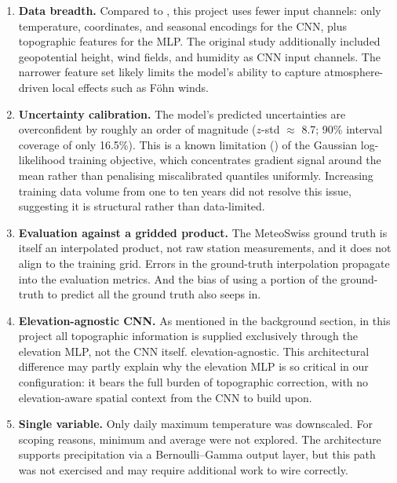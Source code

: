 \begin{enumerate}
    \item \textbf{Data breadth.} Compared to \citet{vaughan2022}, this project uses fewer input channels: only temperature, coordinates, and seasonal encodings for the CNN, plus topographic features for the MLP. The original study additionally included geopotential height, wind fields, and humidity as CNN input channels. The narrower feature set likely limits the model's ability to capture atmosphere-driven local effects such as F\"ohn winds.

    \item \textbf{Uncertainty calibration.} The model's predicted uncertainties are overconfident by roughly an order of magnitude ($z$-std $\approx$ 8.7; 90\% interval coverage of only 16.5\%). This is a known limitation (\citet{guo2017}) of the Gaussian log-likelihood training objective, which concentrates gradient signal around the mean rather than penalising miscalibrated quantiles uniformly. Increasing training data volume from one to ten years did not resolve this issue, suggesting it is structural rather than data-limited.

    \item \textbf{Evaluation against a gridded product.} The MeteoSwiss ground truth is itself an interpolated product, not raw station measurements, and it does not align to the training grid. Errors in the ground-truth interpolation propagate into the evaluation metrics. And the bias of using a portion of the ground-truth to predict all the ground truth also seeps in.

    \item \textbf{Elevation-agnostic CNN.} As mentioned in the background section, in this project all topographic information is supplied exclusively through the elevation MLP, not the CNN itself. elevation-agnostic. This architectural difference may partly explain why the elevation MLP is so critical in our configuration: it bears the full burden of topographic correction, with no elevation-aware spatial context from the CNN to build upon.

    \item \textbf{Single variable.} Only daily maximum temperature was downscaled. For scoping reasons, minimum and average were not explored. The architecture supports precipitation via a Bernoulli--Gamma output layer, but this path was not exercised and may require additional work to wire correctly.
\end{enumerate}

